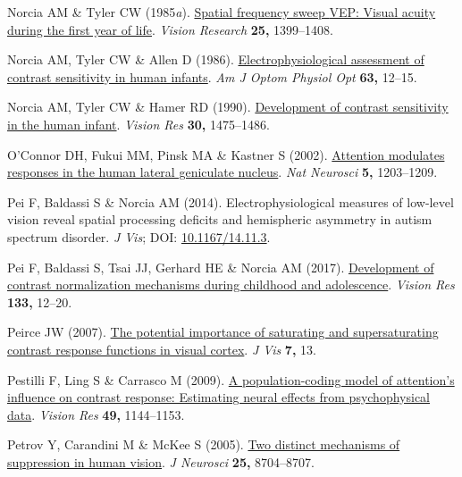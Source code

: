 \documentclass[
  letterpaper,
  DIV=11,
  numbers=noendperiod]{scrartcl}
\newlength{\cslhangindent}
\newenvironment{CSLReferences}[2] %
 {\begin{list}{}{%
  \setlength{\itemindent}{0pt}
  \setlength{\leftmargin}{0pt}
  \setlength{\parsep}{0pt}
  \ifodd #1
   \setlength{\leftmargin}{\cslhangindent}
   \setlength{\itemindent}{-1\cslhangindent}
  \fi
  \setlength{\itemsep}{#2\baselineskip}}}
 {\end{list}}
\begin{document}
\begin{CSLReferences}{1}{1}
Norcia AM \& Tyler CW (1985\emph{a}).
\href{https://doi.org/10.1016/0042-6989(85)90217-2}{Spatial frequency
sweep {VEP}: Visual acuity during the first year of life}. \emph{Vision
Research} \textbf{25,} 1399--1408.

Norcia AM, Tyler CW \& Allen D (1986).
\href{https://doi.org/10.1097/00006324-198601000-00003}{Electrophysiological
assessment of contrast sensitivity in human infants}. \emph{Am J Optom
Physiol Opt} \textbf{63,} 12--15.

Norcia AM, Tyler CW \& Hamer RD (1990).
\href{https://doi.org/10.1016/0042-6989(90)90028-j}{Development of
contrast sensitivity in the human infant}. \emph{Vision Res}
\textbf{30,} 1475--1486.

O'Connor DH, Fukui MM, Pinsk MA \& Kastner S (2002).
\href{https://doi.org/10.1038/nn957}{Attention modulates responses in
the human lateral geniculate nucleus}. \emph{Nat Neurosci} \textbf{5,}
1203--1209.

Pei F, Baldassi S \& Norcia AM (2014). Electrophysiological measures of
low-level vision reveal spatial processing deficits and hemispheric
asymmetry in autism spectrum disorder. \emph{J Vis}; DOI:
\href{https://doi.org/10.1167/14.11.3}{10.1167/14.11.3}.

Pei F, Baldassi S, Tsai JJ, Gerhard HE \& Norcia AM (2017).
\href{https://doi.org/10.1016/j.visres.2016.03.010}{Development of
contrast normalization mechanisms during childhood and adolescence}.
\emph{Vision Res} \textbf{133,} 12--20.

Peirce JW (2007). \href{https://doi.org/10.1167/7.6.13}{The potential
importance of saturating and supersaturating contrast response functions
in visual cortex}. \emph{J Vis} \textbf{7,} 13.

Pestilli F, Ling S \& Carrasco M (2009).
\href{https://doi.org/10.1016/j.visres.2008.09.018}{A population-coding
model of attention's influence on contrast response: Estimating neural
effects from psychophysical data}. \emph{Vision Res} \textbf{49,}
1144--1153.

Petrov Y, Carandini M \& McKee S (2005).
\href{https://doi.org/10.1523/JNEUROSCI.2871-05.2005}{Two distinct
mechanisms of suppression in human vision}. \emph{J Neurosci}
\textbf{25,} 8704--8707.


\end{CSLReferences}
\end{document}
